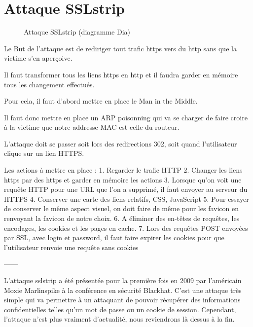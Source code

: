 \chapter{Attaque SSLstrip}

\begin{figure}[H]
  \caption{Attaque SSLstrip (diagramme Dia)}
\end{figure}

Le But de l'attaque est de rediriger tout trafic https vers du http sans que la victime s'en aperçoive.

Il faut transformer tous les liens https en http et il faudra garder en mémoire tous les changement effectués.

Pour cela, il faut d'abord mettre en place le Man in the Middle.

Il faut donc mettre en place un ARP poisonning qui va se charger de faire croire à la victime que notre addresse MAC est celle du routeur.

L'attaque doit se passer soit lors des redirections 302, soit quand l'utilisateur clique sur un lien HTTPS.

Les actions à mettre en place :
1. Regarder le trafic HTTP
2. Changer les liens https par des https et garder en mémoire les actions
3. Lorsque qu'on voit une requête HTTP pour une URL que l'on a supprimé, il faut envoyer au serveur du HTTPS
4. Conserver une carte des liens relatifs, CSS, JavaScript
5. Pour essayer de conserver le même aspect visuel, on doit faire de même pour les favicon en renvoyant la favicon de notre choix.
6. A éliminer des en-têtes de requêtes, les encodages, les cookies et les pages en cache.
7. Lors des requêtes POST envoyées par SSL, avec login et password, il faut faire expirer les cookies pour que l'utilisateur renvoie une requête sans cookies

------

L'attaque sslstrip a été présentée pour la première fois en 2009 par l'américain Moxie Marlinspike à la conférence en sécurité Blackhat. C'est une attaque très simple qui va permettre à un attaquant de pouvoir récupérer des informations confidentielles telles qu'un mot de passe ou un cookie de session. Cependant, l'attaque n'est plus vraiment d'actualité, nous reviendrons là dessus à la fin.

